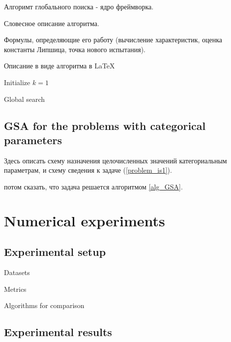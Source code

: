 \documentclass[preprint,12pt]{elsarticle}
\begin{document}
Алгоримт глобального поиска - ядро фреймворка. 

Словесное описание алгоритма.

Формулы, определяющие его работу  (вычисление характеристик, оценка константы Липшица, точка нового испытания).

Описание в виде алгоритма в LaTeX

\begin{algorithm}
\LinesNumbered
 Initialize $k=1$\\
 \caption{Global search}\label{alg_GSA}
\end{algorithm}

\subsection{GSA for the problems with categorical parameters}
\label{sec_mGSA}

Здесь описать схему назначения целочисленных значений категориальным параметрам, и схему сведения к задаче  (\ref{problem_is1}).

потом сказать, что задача решается алгоритмом \ref{alg_GSA}.


\section{Numerical experiments}
\label{sec_exp}

\subsection{Experimental setup}

Datasets

Metrics

Algorithms for comparison

\subsection{Experimental results}
\end{document}
